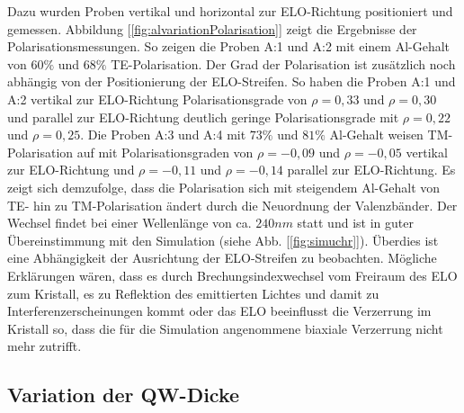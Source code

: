 %
Dazu wurden Proben vertikal und horizontal zur ELO-Richtung positioniert und gemessen. Abbildung [\ref{fig:alvariationPolarisation}] zeigt die Ergebnisse der Polarisationsmessungen. So zeigen die Proben A:1 und A:2 mit einem Al-Gehalt von $60\%$ und $68\%$ TE-Polarisation. Der Grad der Polarisation ist zus\"atzlich noch abh\"angig von der Positionierung der ELO-Streifen. So haben die Proben A:1 und A:2 vertikal zur ELO-Richtung Polarisationsgrade von $\rho = 0,33$ und $\rho = 0,30$ und parallel zur ELO-Richtung deutlich geringe Polarisationsgrade mit $\rho = 0,22$ und $\rho = 0,25$. Die Proben A:3 und A:4 mit $73\%$ und $81\%$ Al-Gehalt weisen TM-Polarisation auf mit Polarisationsgraden von $\rho = -0,09$ und $\rho = -0,05$ vertikal zur ELO-Richtung und $\rho = -0,11$ und $\rho = -0,14$ parallel zur ELO-Richtung. Es zeigt sich demzufolge, dass die Polarisation sich mit steigendem Al-Gehalt von TE- hin zu TM-Polarisation \"andert durch die Neuordnung der Valenzb\"ander. Der Wechsel findet bei einer Wellenl\"ange von ca. $240nm$ statt und ist in guter \"Ubereinstimmung mit den Simulation (siehe Abb. [\ref{fig:simuchr}]). \"Uberdies ist eine Abh\"angigkeit der Ausrichtung der ELO-Streifen zu beobachten. M\"ogliche Erkl\"arungen w\"aren, dass es durch Brechungsindexwechsel vom Freiraum des ELO zum Kristall, es zu Reflektion des emittierten Lichtes und damit zu Interferenzerscheinungen kommt oder das ELO beeinflusst die Verzerrung im Kristall so, dass die f\"ur die Simulation angenommene biaxiale Verzerrung nicht mehr zutrifft. 

\subsection{Variation der QW-Dicke}


